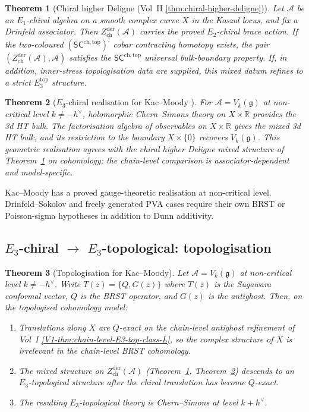 \documentclass[11pt]{article}
\newtheorem{theorem}{Theorem}[section]
\theoremstyle{remark}
\providecommand{\cA}{\mathcal{A}}
\providecommand{\bR}{\mathbb{R}}
\providecommand{\fg}{\mathfrak{g}}
\providecommand{\SCchtop}{\mathsf{SC}^{\mathrm{ch},\mathrm{top}}}
\begin{document}
\begin{theorem}[Chiral higher Deligne (Vol~II
\ref*{thm:chiral-higher-deligne})]%
\label{thm:chiral-higher-deligne-standalone}%
Let $\cA$ be an $E_1$-chiral algebra on a smooth complex curve $X$ in
the Koszul locus, and fix a Drinfeld associator. Then
$Z^{\mathrm{der}}_{\mathrm{ch}}(\cA)$ carries the proved $E_2$-chiral
brace action.  If the two-coloured $(\SCchtop)^!$ cobar contracting
homotopy exists, the pair
$(Z^{\mathrm{der}}_{\mathrm{ch}}(\cA),\cA)$ satisfies the
$\SCchtop$ universal bulk-boundary property.  If, in addition,
inner-stress topologisation data are supplied, this mixed datum refines
to a strict $E_3^{\mathrm{top}}$ structure.
\end{theorem}

\begin{theorem}[$E_3$-chiral realisation for Kac--Moody {\cite{CFG}}]%
\label{thm:e3-km}%
For $\cA = V_k(\fg)$ at non-critical level $k \ne -h^\vee$,
holomorphic Chern--Simons theory on $X \times \bR$ provides the
3d HT bulk.  The factorisation algebra of observables on
$X \times \bR$ gives the mixed 3d HT bulk, and its restriction to
the boundary $X \times \{0\}$ recovers $V_k(\fg)$. This geometric
realisation agrees with the chiral higher Deligne mixed structure of
Theorem~\ref{thm:chiral-higher-deligne-standalone} on cohomology; the
chain-level comparison is associator-dependent and model-specific.
\end{theorem}

Kac--Moody has a proved gauge-theoretic realisation at non-critical
level.  Drinfeld--Sokolov and freely generated PVA cases require their
own BRST or Poisson-sigma hypotheses in addition to Dunn additivity.

\subsection*{$E_3$-chiral $\to$ $E_3$-topological: topologisation}

\begin{theorem}[Topologisation for Kac--Moody]%
\label{thm:topologise}%
Let $\cA = V_k(\fg)$ at non-critical level $k \ne -h^\vee$.
Write $T(z) = \{Q, G(z)\}$ where $T(z)$ is the Sugawara conformal
vector, $Q$ is the BRST operator, and $G(z)$ is the antighost.
Then, on the topologised cohomology model:
\begin{enumerate}[label=\textup{(\alph*)}]
\item Translations along $X$ are $Q$-exact on the chain-level
  antighost refinement of Vol~I
  \ref*{V1-thm:chain-level-E3-top-class-L}, so the complex structure
  of $X$ is irrelevant in the chain-level BRST cohomology.
\item The mixed structure on
  $Z^{\mathrm{der}}_{\mathrm{ch}}(\cA)$
  (Theorem~\ref{thm:chiral-higher-deligne-standalone},
  Theorem~\ref{thm:e3-km}) descends to an
  $E_3$-topological structure after the chiral translation has become
  $Q$-exact.
\item The resulting $E_3$-topological theory is Chern--Simons at
  level $k + h^\vee$.
\end{enumerate}
\end{theorem}
\end{document}
